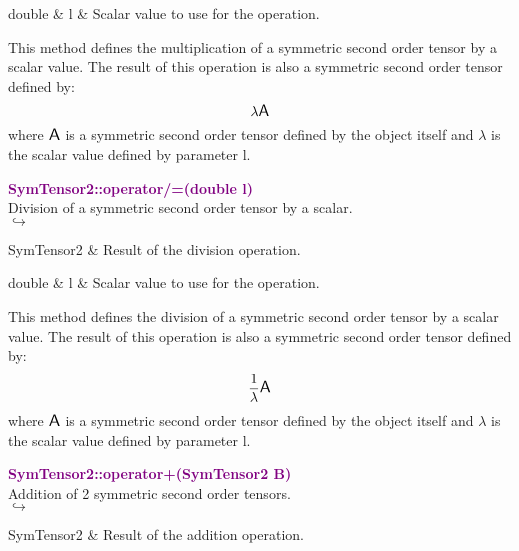 \begin{tcolorbox}[width=\textwidth,myArgs,tabularx={ll|R}]
double & l & Scalar value to use for the operation.
\end{tcolorbox}

This method defines the multiplication of a symmetric second order tensor by a scalar value.
The result of this operation is also a symmetric second order tensor defined by:
\begin{equation*}
\lambda \mbox{\large\ensuremath{\mathsf{A}}}
\end{equation*}
where $\mbox{\large\ensuremath{\mathsf{A}}}$ is a symmetric second order tensor defined by the object itself and $\lambda$ is the scalar value defined by parameter l.

\textcolor{purple}{\textbf{SymTensor2::operator/=(double l)}}\label{SymTensor2::operator/=(double l)}\\
Division of a symmetric second order tensor by a scalar.\\ \hspace*{5mm}$\hookrightarrow$
\vspace*{-2em}\begin{tcolorbox}[grow to left by=-1cm, width=\textwidth-1cm,myArgs,tabularx={l|R}]
SymTensor2 & Result of the division operation.
\end{tcolorbox}

\begin{tcolorbox}[width=\textwidth,myArgs,tabularx={ll|R}]
double & l & Scalar value to use for the operation.
\end{tcolorbox}

This method defines the division of a symmetric second order tensor by a scalar value.
The result of this operation is also a symmetric second order tensor defined by:
\begin{equation*}
\frac{1}{\lambda} \mbox{\large\ensuremath{\mathsf{A}}}
\end{equation*}
where $\mbox{\large\ensuremath{\mathsf{A}}}$ is a symmetric second order tensor defined by the object itself and $\lambda$ is the scalar value defined by parameter l.

\textcolor{purple}{\textbf{SymTensor2::operator+(SymTensor2 B)}}\label{SymTensor2::operator+(SymTensor2 B)}\\
Addition of 2 symmetric second order tensors.\\ \hspace*{5mm}$\hookrightarrow$
\vspace*{-2em}\begin{tcolorbox}[grow to left by=-1cm, width=\textwidth-1cm,myArgs,tabularx={l|R}]
SymTensor2 & Result of the addition operation.
\end{tcolorbox}


